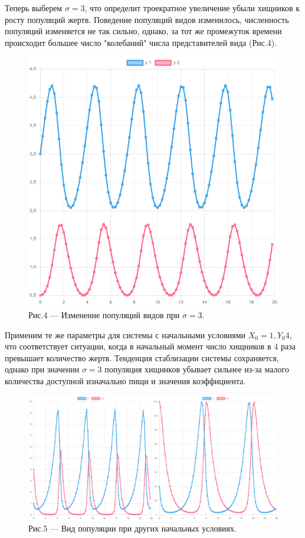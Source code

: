 \documentclass[a4paper,12pt]{article}
\begin{document}
Теперь выберем $\sigma = 3$, что определит троекратное увеличение убыли хищников
к росту популяций жертв. Поведение популяций видов изменилось, численность популяций изменяется не так сильно,
однако, за тот же промежуток времени происходит большее число "колебаний" числа представителей вида (Рис.4).
\begin{figure}[h]
    \centering
    \includegraphics[width=0.5\linewidth]{pictures/task2.png}
    \captionsetup{labelformat=empty}
    \caption{Рис.4 --- Изменение популяций видов при $\sigma = 3$.}
\end{figure}

Применим те же параметры для системы с начальными условиями $X_0 = 1, Y_0 4$, что соответствует 
ситуации, когда в начальный момент число хищников в 4 раза превышает количество жертв.
Тенденция стаблизации системы сохраняется, однако при значении $\sigma = 3$ популяция 
хищников убывает сильнее из-за малого количества доступной изначально пищи и значения коэффициента.
\begin{figure}[h]
    \centering
    \includegraphics[width=1\linewidth]{pictures/task3.png}
    \captionsetup{labelformat=empty}
    \caption{Рис.5 --- Вид популяции при других начальных условиях.}
\end{figure}
\newpage
\end{document}
